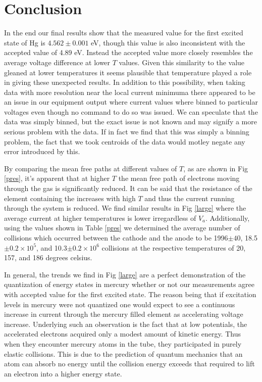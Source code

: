 \documentclass[prb,preprint]{revtex4-1}
\begin{document}
\section{Conclusion}

In the end our final results show that the measured value for the first excited state of Hg is $4.562\pm0.001$ eV, though this value is also inconsistent with the accepted value of 4.89 eV. Instead the accepted value more closely resembles the average voltage difference at lower $T$ values. Given this similarity to the value gleaned at lower temperatures it seems plausible that temperature played a role in giving these unexpected results. In addition to this possibility, when taking data with more resolution near the local current minimuma there appeared to be an issue in our equipment output where current values where binned to particular voltages even though no command to do so was issued. We can speculate that the data was simply binned, but the exact issue is not known and may signify a more serious problem with the data. If in fact we find that this was simply a binning problem, the fact that we took centroids of the data would motley negate any error introduced by this.

By comparing the mean free paths at different values of $T$, as are shown in Fig \ref{pres}, it's apparent that at higher $T$ the mean free path of electrons moving through the gas is significantly reduced. It can be said that the resistance of the element containing the increases with high $T$ and thus the current running through the system is reduced. We find similar results in Fig \ref{large} where the average current at higher temperatures is lower irregardless of $V_a$. Additionally, using the values shown in Table \ref{pres} we determined the average number of collisions which occurred between the cathode and the anode to be 1996$\pm40$, 18.5$\pm0.2\times10^5$, and 10.3$\pm0.2\times10^6$ collisions at the respective temperatures of 20, 157, and 186 degrees celsius.

In general, the trends we find in Fig \ref{large} are a perfect demonstration of the quantization of energy states in mercury whether or not our measurements agree with accepted value for the first excited state. The reason being that if excitation levels in mercury were not quantized one would expect to see a continuous increase in current through the mercury filled element as accelerating voltage increase. Underlying such an observation is the fact that at low potentials, the accelerated electrons acquired only a modest amount of kinetic energy. Thus when they encounter mercury atoms in the tube, they participated in purely elastic collisions. This is due to the prediction of quantum mechanics that an atom can absorb no energy until the collision energy exceeds that required to lift an electron into a higher energy state.
\end{document}
